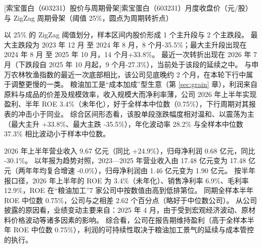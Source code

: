 \begin{center}
\begin{minipage}{\textwidth}\centering
{}

[索宝蛋白（603231）股价与周期骨架]{索宝蛋白（603231）月度收盘价（元/股）与 ZigZag 周期骨架（阈值 25\%，圆点为周期转折点）}
\end{minipage}
\end{center}

 以 25\% 的 ZigZag 阈值划分，样本区间内股价形成 1 个主升段与 2 个主跌段。 最大主跌段为 2023 年 12 月 至 2024 年 8 月，8 个月-35.5\%；最大主升段出现在 2024 年 8 月 至 2025 年 10 月，14 个月+33.8\%。 最近一次转折出现在 2026 年 7 月（下跌段自 2025 年 10 月起，9 个月-27.3\%），当前处于该段的延续之中。 与申万农林牧渔指数的最近一次底部相比，该公司见底晚约 2 个月，在本轮下行中属于调整更慢的一类。 粮油加工是“成本加成”型生意（第 \ref{sec:grain} 章），利润来自原料与成品的价差及规模效率，收入规模大而净利率薄，公司 2026 年上半年实现盈利、半年 ROE 3.4\%（未年化），好于全样本中位数（0.75\%），下行周期对其报表的冲击小于同业。 综合区间形态看，该股单段涨跌幅度相对温和、以震荡为主（最大主升 +33.8\%、最大主跌 -35.5\%），年化波动率 28.2\% 与全样本中位数 37.3\% 相比波动小于样本中位数。

 2026 年上半年营业收入 9.67 亿元（同比 +24.9\%），归母净利润 0.68 亿元，同比 -30.1\%。 以年报为趋势对照，2023---2025 年营业收入由 17.48 亿元变为 17.48 亿元（两年年均复合增速 -0.0\%），归母净利润由 1.46 亿元变为 1.90 亿元。 按半年报口径，2026 年上半年的 ROE 为 3.4\%（未年化）、销售净利率 6.9\%、毛利率 12.9\%，ROE 在“粮油加工”7 家公司中按数值由高到低排第位。 同期全样本半年 ROE 中位数 0.75\%，公司与之相差 2.62 个百分点（略好于中位数公司）。 从公司披露的原因看，业绩变动主要来自：2025 年 4 月，由于受到宏观经济波动、原材料价格波动等诸多因素的影响。 综合看，公司在报告期维持盈利（高于全样本半年 ROE 中位数 0.75\%），利润的可持续性取决于粮油加工景气的延续与成本管控的执行。

